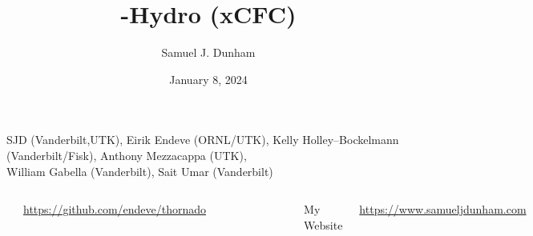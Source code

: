 \documentclass{beamer}
\title[AAS 243]{\thornado-Hydro (xCFC)}
\author{Samuel J. Dunham}
\date{January 8, 2024}
\begin{document}
\begin{frame}

  \maketitle

  \vspace{-1em}

  \begin{center}
    SJD (Vanderbilt,UTK), %
    Eirik Endeve (ORNL/UTK), %
    Kelly Holley--Bockelmann (Vanderbilt/Fisk), %
    Anthony Mezzacappa (UTK), \\
    William Gabella (Vanderbilt), %
    Sait Umar (Vanderbilt)
  \end{center}

  \vspace{-1em}

  \begin{columns}[c]

      \begin{center}\thornado\end{center}
      \vspace{-2.0em}
      \begin{center}{\tiny \url{https://github.com/endeve/thornado}}\end{center}
      \vspace{-1.5em}
      \begin{figure}[htb!]
       \centering
       \includegraphics[width=0.2\textwidth]{fig.thornado.png}
      \end{figure}

      \begin{center}My Website\end{center}
      \vspace{-2.0em}
      \begin{center}{\tiny \url{https://www.samueljdunham.com}}\end{center}
      \vspace{-1.5em}
      \begin{figure}[htb!]
       \centering
       \includegraphics[width=0.2\textwidth]{fig.website.png}
      \end{figure}

  \end{columns}

\end{frame}
\end{document}
